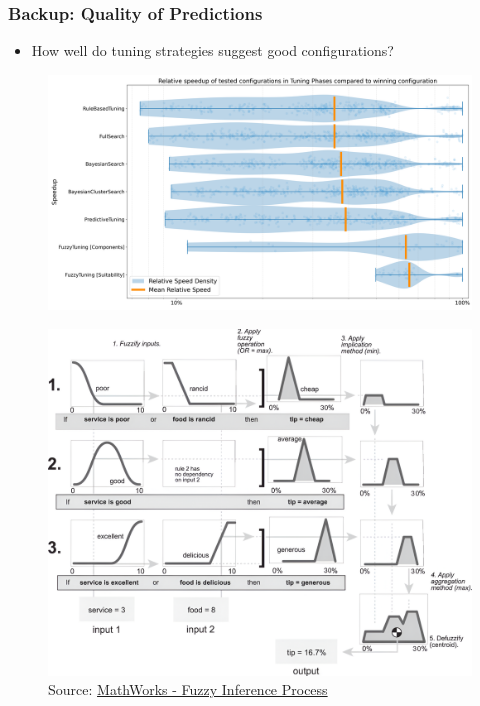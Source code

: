 \documentclass[
	10pt,
	t		%
]{beamer}
\begin{document}
\begin{frame}
	\frametitle{Backup: Quality of Predictions}
	
	\begin{itemize}
		\item How well do tuning strategies suggest good configurations?
	\end{itemize}
	
	\begin{figure}
		\includegraphics[width=0.8\paperwidth]{figures/prediction-quality.png}
	\end{figure}
	
\end{frame}

\begin{frame}
	\vspace{-0.8cm}
	\begin{figure}
		\centering
		\caption{\tiny{Source: \href{https://de.mathworks.com/help/fuzzy/fuzzy-inference-process.html}{MathWorks - Fuzzy Inference Process}}}
		\includegraphics[width=0.8\paperwidth]{figures/FullInferenceProcess.png}
	\end{figure}
	\label{fig:fuzzy_inference_full}
	
\end{frame}
\end{document}

